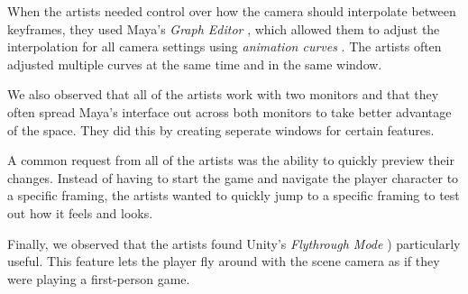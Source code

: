 When the artists needed control over how the camera should interpolate between keyframes, they used   Maya's \textit{Graph Editor} \cite{maya_graph}, which allowed them to adjust the interpolation for all camera settings using \textit{animation curves} \cite{maya_graph}. The artists often adjusted multiple curves at the same time and in the same window.

We also observed that all of the artists work with two monitors and that they often spread Maya's interface out across both monitors to take better advantage of the space. They did this by creating seperate windows for certain features. 

A common request from all of the artists was the ability to quickly preview their changes. Instead of having to start the game and navigate the player character to a specific framing, the artists wanted to quickly jump to a specific framing to test out how it feels and looks.

Finally, we observed that the artists found Unity's \textit{Flythrough Mode} \cite{unity_flyMode}) particularly useful. This feature lets the player fly around with the scene camera as if they were playing a first-person game.





